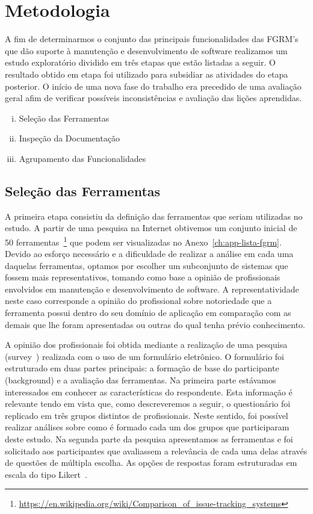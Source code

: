 \section{Metodologia}
\label{sec:metodologia}

A fim de determinarmos o conjunto das principais funcionalidades das FGRM's que
dão suporte à manutenção e desenvolvimento de software realizamos um estudo
exploratório dividido em três etapas que estão listadas a seguir. O resultado
obtido em etapa foi utilizado para subsidiar as atividades do etapa posterior.
O início de uma nova fase do trabalho era precedido de uma avaliação geral afim
de verificar possíveis inconsistências e avaliação das lições aprendidas.

\begin{enumerate}[(i)]
	\item Seleção das Ferramentas
	\item Inspeção da Documentação
	\item Agrupamento das Funcionalidades
\end{enumerate}

\subsection{Seleção das Ferramentas}
\label{subsec:selecao-ferramentas}

A primeira etapa consistiu da definição das ferramentas que seriam utilizadas no
estudo. A partir de uma pesquisa na Internet obtivemos um conjunto inicial de 50
ferramentas~\footnote{\url{https://en.wikipedia.org/wiki/Comparison_of_issue-tracking_systems}}
que podem ser visualizadas no Anexo~\ref{ch:app-lista-fgrm}. Devido ao esforço
necessário e a dificuldade de realizar a análise em cada uma daquelas
ferramentas, optamos por escolher um subconjunto de sistemas que fossem mais
representativos, tomando como base a opinião de profissionais envolvidos em
manutenção e desenvolvimento de software. A representatividade neste caso
corresponde a opinião do profissional sobre notoriedade que a ferramenta possui
dentro do seu domínio de aplicação em comparação com as demais que lhe foram
apresentadas ou outras do qual tenha prévio conhecimento.

A opinião dos profissionais foi obtida mediante a realização de uma pesquisa
(survey~\cite{wohlin2012experimentation}) realizada com o uso de um formulário
eletrônico. O formulário foi estruturado em duas partes principais: a formação
de base do participante (background) e a avaliação das ferramentas. Na primeira
parte estávamos interessados em conhecer as características do respondente. Esta
informação é relevante tendo em vista que, como descreveremos a seguir, o
questionário foi replicado em três grupos distintos de profissionais. Neste
sentido, foi possível realizar análises sobre como é formado cada um dos grupos
que participaram deste estudo. Na segunda parte da pesquisa apresentamos as
ferramentas e foi solicitado aos participantes que avaliassem a relevância de
cada uma delas através de questões de múltipla escolha. As opções de respostas
foram estruturadas em escala do tipo Likert~\cite{robbins2011plotting}.

